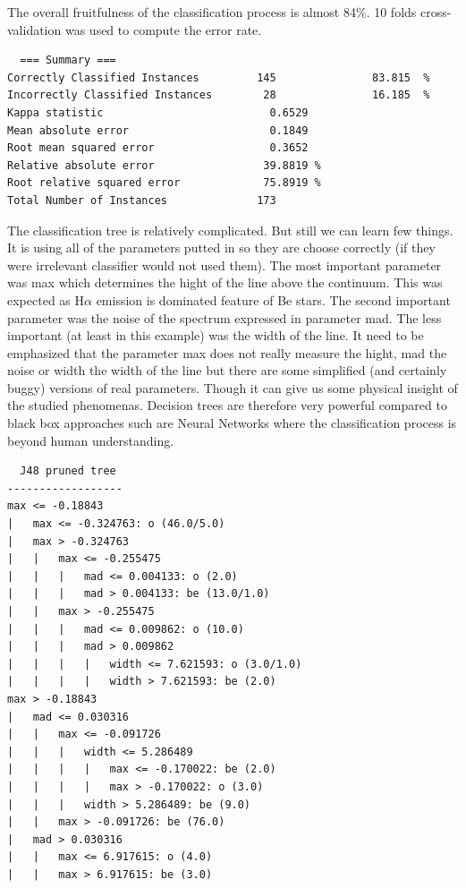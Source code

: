 The overall fruitfulness of the classification process is almost
84\%. 10 folds cross-validation was used to compute the error
rate. 


\begin{lstlisting}
  === Summary ===
Correctly Classified Instances         145               83.815  %
Incorrectly Classified Instances        28               16.185  %
Kappa statistic                          0.6529
Mean absolute error                      0.1849
Root mean squared error                  0.3652
Relative absolute error                 39.8819 %
Root relative squared error             75.8919 %
Total Number of Instances              173     
\end{lstlisting}

The classification tree is relatively complicated. But still we can
learn few things. It is using all of the parameters putted in so they
are choose correctly (if they were irrelevant classifier would not
used them). The most important parameter was \textrm{max} which
determines the hight of the line above the continuum. This was
expected as H$\alpha$ emission is dominated feature of Be stars. The
second important parameter was the noise of the spectrum expressed in
parameter \textrm{mad}. The less important (at least in this example)
was the width of the line. It need to be emphasized that the parameter
\textrm{max} does not really measure the hight, \textrm{mad} the noise
or \textrm{width} the width of the line but there are some simplified
(and certainly buggy) versions of real parameters. Though it can give
us some physical insight of the studied phenomenas. Decision trees are
therefore very powerful compared to black box approaches such are
Neural Networks where the classification process is beyond human
understanding.

\begin{lstlisting}
  J48 pruned tree
------------------
max <= -0.18843
|   max <= -0.324763: o (46.0/5.0)
|   max > -0.324763
|   |   max <= -0.255475
|   |   |   mad <= 0.004133: o (2.0)
|   |   |   mad > 0.004133: be (13.0/1.0)
|   |   max > -0.255475
|   |   |   mad <= 0.009862: o (10.0)
|   |   |   mad > 0.009862
|   |   |   |   width <= 7.621593: o (3.0/1.0)
|   |   |   |   width > 7.621593: be (2.0)
max > -0.18843
|   mad <= 0.030316
|   |   max <= -0.091726
|   |   |   width <= 5.286489
|   |   |   |   max <= -0.170022: be (2.0)
|   |   |   |   max > -0.170022: o (3.0)
|   |   |   width > 5.286489: be (9.0)
|   |   max > -0.091726: be (76.0)
|   mad > 0.030316
|   |   max <= 6.917615: o (4.0)
|   |   max > 6.917615: be (3.0)
\end{lstlisting}


